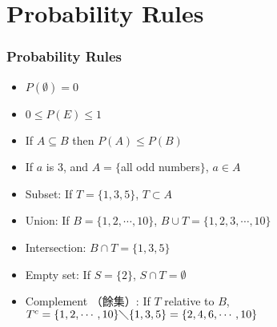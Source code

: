 \documentclass{beamer}
\begin{document}
\section{Probability Rules}
\begin{frame}
  \frametitle{Probability Rules}
    \begin{itemize}
     \item $P(\emptyset)=0$
     \item $0\leq P(E)\leq 1$
  \item If $A \subseteq B$ then $P(A)\leq P(B)$
  \item If $a$ is 3, and $A=\{$all odd numbers$\}$, $a \in A$
  \item Subset: If $T=\{1,3,5\}$, $T \subset A$
  \item Union: If $B=\{1,2,\cdots,10\} $, $ B\cup T=\{1,2,3,\cdots, 10\} $
  \item Intersection: $ B\cap T=\{1,3,5\} $
  \item Empty set: If $S=\{2\}  $, $S \cap T=\emptyset$
 
  \item Complement （餘集）: If $T$ relative to $B$, $T^c=\{1,2,\cdots,10\}\diagdown\{1,3,5\}=\{2,4,6,\cdots,10\}$
  \end{itemize}
\end{frame}
\end{document}
